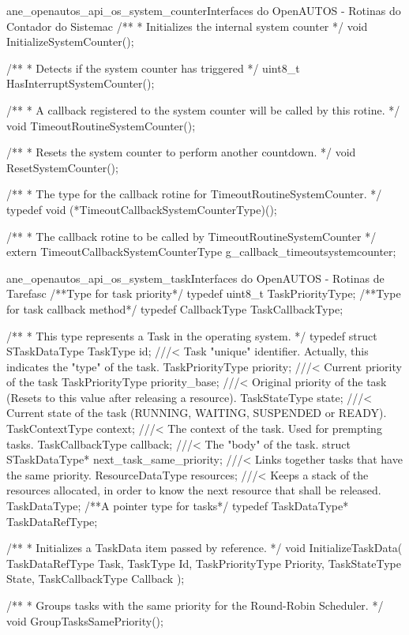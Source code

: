 \begin{algoritmo}{ane_openautos_api_os_system_counter}{Interfaces do OpenAUTOS - Rotinas do Contador do Sistema}{c}
/**
* Initializes the internal system counter
*/
void InitializeSystemCounter();

/**
* Detects if the system counter has triggered
*/
uint8_t HasInterruptSystemCounter();

/**
* A callback registered to the system counter will be called by this rotine.
*/
void TimeoutRoutineSystemCounter();

/**
* Resets the system counter to perform another countdown.
*/
void ResetSystemCounter();

/**
* The type for the callback rotine for TimeoutRoutineSystemCounter.
*/
typedef void (*TimeoutCallbackSystemCounterType)();

/**
* The callback rotine to be called by TimeoutRoutineSystemCounter
*/
extern TimeoutCallbackSystemCounterType g_callback_timeoutsystemcounter;
\end{algoritmo}

\begin{algoritmo}{ane_openautos_api_os_system_task}{Interfaces do OpenAUTOS - Rotinas de Tarefas}{c}
/**Type for task priority*/
typedef uint8_t TaskPriorityType;
/**Type for task callback method*/
typedef CallbackType TaskCallbackType;

/**
* This type represents a Task in the operating system.
*/
typedef struct STaskDataType {
	TaskType id;											///< Task "unique" identifier. Actually, this indicates the "type" of the task.
	TaskPriorityType priority;								///< Current priority of the task
	TaskPriorityType priority_base;							///< Original priority of the task (Resets to this value after releasing a resource).
	TaskStateType state;									///< Current state of the task (RUNNING, WAITING, SUSPENDED or READY).
	TaskContextType context;								///< The context of the task. Used for prempting tasks.
	TaskCallbackType callback;								///< The "body" of the task.
	struct STaskDataType* next_task_same_priority;			///< Links together tasks that have the same priority.    	
	ResourceDataType resources;                             ///< Keeps a stack of the resources allocated, in order to know the next resource that shall be released.
} TaskDataType;
/**A pointer type for tasks*/
typedef TaskDataType* TaskDataRefType;

/**
* Initializes a TaskData item passed by reference.
*/
void InitializeTaskData( TaskDataRefType Task, TaskType Id, TaskPriorityType Priority, TaskStateType State, TaskCallbackType Callback );

/**
* Groups tasks with the same priority for the Round-Robin Scheduler.
*/
void GroupTasksSamePriority();
\end{algoritmo}

